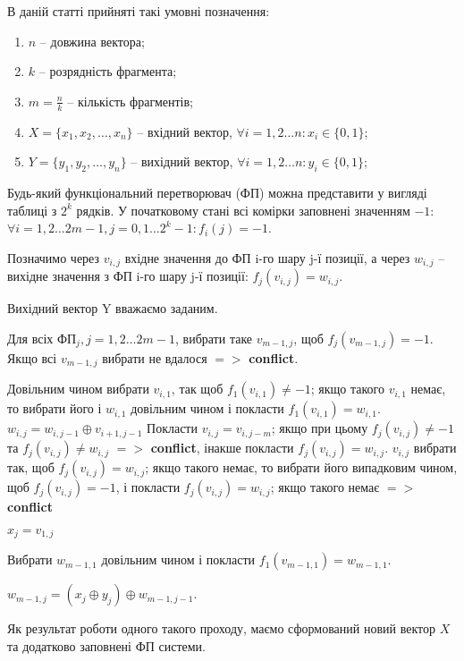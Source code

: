 \documentclass[12pt]{article}
\begin{document}

В даній статті прийняті такі умовні позначення:
\begin{enumerate}
\item $n$ -- довжина вектора;
\item $k$ -- розрядність фрагмента;
\item $m = \frac{n}{k}$ -- кількість фрагментів;
\item $X = \{x_1, x_2, \dotsc , x_n\}$ -- вхідний вектор, $\forall i=1,2 \ldots n : x_i \in \{0,1\}$;
\item $Y = \{y_1, y_2, \dotsc , y_n\}$ -- вихідний вектор, $\forall i=1,2 \ldots n : y_i \in \{0,1\}$;
\end{enumerate}

Будь-який функціональний перетворювач (ФП) можна представити у вигляді таблиці з $2^k$ рядків. У початковому стані всі комірки заповнені значенням $-1$: $\forall i=1,2 \ldots 2m-1, j=0,1 \ldots 2^k-1 : f_i(j) = -1$.

Позначимо через $v_{i,j}$ вхідне значення до ФП i-го шару j-ї позиції, а через $w_{i,j}$ -- вихідне значення з ФП i-го шару j-ї позиції: $f_j(v_{i,j}) = w_{i,j}$.

Вихідний вектор Y вважаємо заданим.

\vspace{2em}


Для всіх ФП$_j, j=1,2 \ldots 2m-1$, вибрати таке $v_{m-1,j}$, щоб $f_j(v_{m-1,j})=-1$. Якщо всі $v_{m-1,j}$ вибрати не вдалося $=>$ \textbf{conflict}.

\begin{algorithmic}
	\State Довільним чином вибрати $v_{i,1}$, так щоб $f_1(v_{i,1}) \neq -1 $;
	\State якщо такого $v_{i,1}$ немає, то вибрати його і $w_{i,1}$ довільним чином
	\State і покласти $f_1(v_{i,1}) = w_{i,1}$.
		\State $w_{i,j} = w_{i,j-1} \oplus v_{i+1,j-1}$
			\State Покласти $v_{i,j} = v_{i,j-m}$; якщо при цьому
			\State $f_j(v_{i,j}) \neq -1$ та $f_j(v_{i,j}) \neq w_{i,j}$ $=>$ \textbf{conflict},
			\State інакше покласти $f_j(v_{i,j}) = w_{i,j}$.
		\Else
			\State $v_{i,j}$ вибрати так, щоб $f_j(v_{i,j}) = w_{i,j}$; якщо такого немає,
			\State то вибрати його випадковим чином, щоб $f_j(v_{i,j}) = -1$,
			\State і покласти $f_j(v_{i,j}) = w_{i,j}$; якщо такого немає $=>$ \textbf{conflict}
		\EndIf
	\EndFor
\EndFor

	\State $x_j = v_{1,j}$
\EndFor

Вибрати $w_{m-1,1}$ довільним чином і покласти $f_1(v_{m-1,1}) = w_{m-1,1}$.

	\State $w_{m-1,j} = (x_j \oplus y_j) \oplus w_{m-1,j-1}$.
\EndFor
\end{algorithmic}

\vspace{2em}

Як результат роботи одного такого проходу, маємо сформований новий вектор $X$ та додатково заповнені ФП системи.
\end{document}
